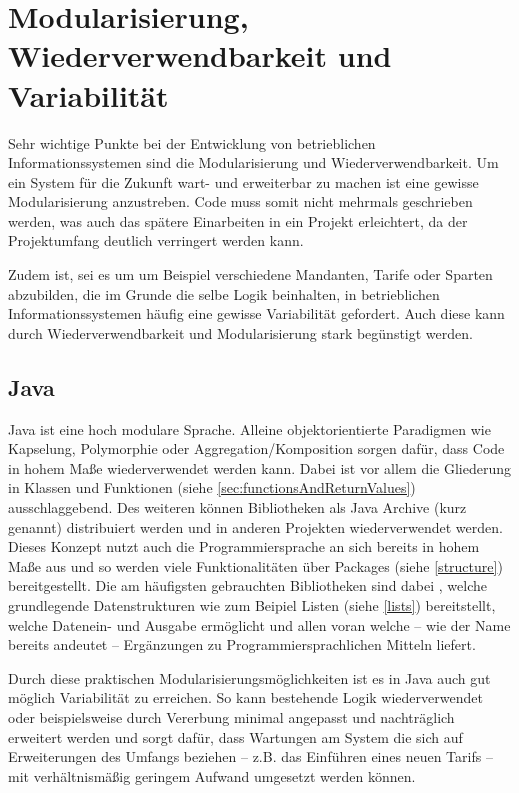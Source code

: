 \section{Modularisierung, Wiederverwendbarkeit und Variabilität}\label{wiederverwendbarkeit}
Sehr wichtige Punkte bei der Entwicklung von betrieblichen Informationssystemen sind die Modularisierung und Wiederverwendbarkeit. Um ein System für die Zukunft wart- und erweiterbar zu machen ist eine gewisse Modularisierung anzustreben. Code muss somit nicht mehrmals geschrieben werden, was auch das spätere Einarbeiten in ein Projekt erleichtert, da der Projektumfang deutlich verringert werden kann. 

Zudem ist, sei es um um Beispiel verschiedene Mandanten, Tarife oder Sparten abzubilden, die im Grunde die selbe Logik beinhalten, in betrieblichen Informationssystemen häufig eine gewisse Variabilität gefordert. Auch diese kann durch Wiederverwendbarkeit und Modularisierung stark begünstigt werden.

\subsection*{Java}
Java ist eine hoch modulare Sprache. Alleine objektorientierte Paradigmen wie Kapselung, Polymorphie oder Aggregation/Komposition sorgen dafür, dass Code in hohem Maße wiederverwendet werden kann. Dabei ist vor allem die Gliederung in Klassen und Funktionen (siehe \autoref{sec:functionsAndReturnValues}) ausschlaggebend. Des weiteren können Bibliotheken als Java Archive (kurz  genannt) dis­tri­bu­ie­rt werden und in anderen Projekten wiederverwendet werden. Dieses Konzept nutzt auch die Programmiersprache an sich bereits in hohem Maße aus und so werden viele Funktionalitäten über Packages (siehe \autoref{structure}) bereitgestellt. Die am häufigsten gebrauchten Bibliotheken sind dabei , welche grundlegende Datenstrukturen wie zum Beipiel Listen (siehe \autoref{lists}) bereitstellt,  welche Datenein- und Ausgabe ermöglicht und allen voran  welche -- wie der Name bereits andeutet -- Ergänzungen zu Programmiersprachlichen Mitteln liefert. 

Durch diese praktischen Modularisierungsmöglichkeiten ist es in Java auch gut möglich Variabilität zu erreichen. So kann bestehende Logik wiederverwendet oder beispielsweise durch Vererbung minimal angepasst und nachträglich erweitert werden und sorgt dafür, dass Wartungen am System die sich auf Erweiterungen des Umfangs beziehen -- z.B. das Einführen eines neuen Tarifs -- mit verhältnismäßig geringem Aufwand umgesetzt werden können.

